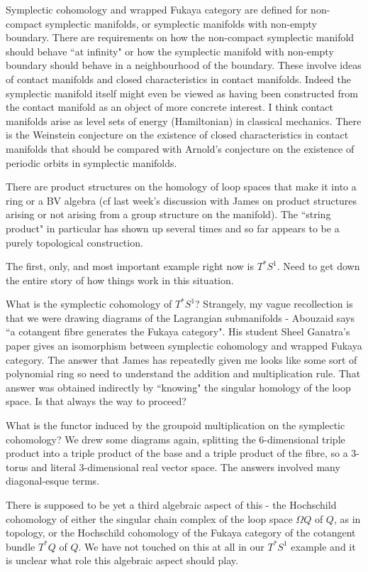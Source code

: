 \documentclass[hidelinks, 12pt]{article}
\theoremstyle{mydefstyle}
\theoremstyle{mythmstyle}
\begin{document}
Symplectic cohomology and wrapped Fukaya category are defined for non-compact symplectic manifolds, or symplectic manifolds with non-empty boundary. There are requirements on how the non-compact symplectic manifold should behave ``at infinity" or how the symplectic manifold with non-empty boundary should behave in a neighbourhood of the boundary. These involve ideas of contact manifolds and closed characteristics in contact manifolds. Indeed the symplectic manifold itself might even be viewed as having been constructed from the contact manifold as an object of more concrete interest. I think contact manifolds arise as level sets of energy (Hamiltonian) in classical mechanics. There is the Weinstein conjecture on the existence of closed characteristics in contact manifolds that should be compared with Arnold's conjecture on the existence of periodic orbits in symplectic manifolds.

There are product structures on the homology of loop spaces that make it into a ring or a BV algebra (cf last week's discussion with James on product structures arising or not arising from a group structure on the manifold). The ``string product" in particular has shown up several times and so far appears to be a purely topological construction. 

The first, only, and most important example right now is $T^*S^1$. Need to get down the entire story of how things work in this situation. 

What is the symplectic cohomology of $T^*S^1$? Strangely, my vague recollection is that we were drawing diagrams of the Lagrangian submanifolds - Abouzaid says ``a cotangent fibre generates the Fukaya category". His student Sheel Ganatra's paper gives an isomorphism between symplectic cohomology and wrapped Fukaya category. The answer that James has repeatedly given me looks like some sort of polynomial ring so need to understand the addition and multiplication rule. That answer was obtained indirectly by ``knowing" the singular homology of the loop space. Is that always the way to proceed? 

What is the functor induced by the groupoid multiplication on the symplectic cohomology? We drew some diagrams again, splitting the 6-dimensional triple product into a triple product of the base and a triple product of the fibre, so a 3-torus and literal 3-dimensional real vector space. The answers involved many diagonal-esque terms. 

There is supposed to be yet a third algebraic aspect of this - the Hochschild cohomology of either the singular chain complex of the loop space $\Omega Q$ of $Q$, as in topology, or the Hochschild cohomology of the Fukaya category of the cotangent bundle $T^*Q$ of $Q$. We have not touched on this at all in our $T^*S^1$ example and it is unclear what role this algebraic aspect should play.
\end{document}
